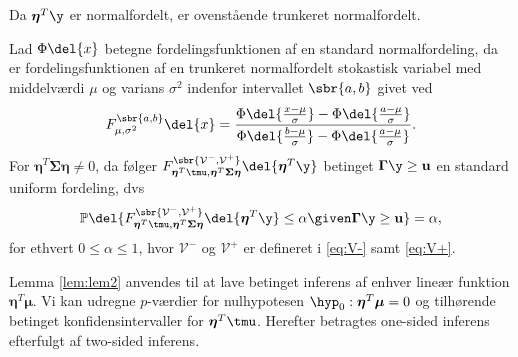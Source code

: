 Da \(\boldsymbol{\eta}^T \y\) er normalfordelt, er ovenstående trunkeret normalfordelt.
%
\begin{lem}  \label{lem:lem2}
Lad \(\Phi \del{x}\) betegne fordelingsfunktionen af en standard normalfordeling, da er fordelingsfunktionen af en trunkeret normalfordelt stokastisk variabel med middelværdi \(\mu\) og varians \(\sigma^2\) indenfor intervallet \(\sbr{a,b}\) givet ved
\begin{align*}
F_{\mu, \sigma^2}^{\sbr{a,b}} \del{x} = \frac{\Phi\del{\frac{x-\mu}{\sigma}} - \Phi\del{\frac{a-\mu}{\sigma}}}{\Phi\del{\frac{b-\mu}{\sigma}} - \Phi\del{\frac{a-\mu}{\sigma}}}.
\end{align*}
For \(\boldsymbol{\eta}^T \boldsymbol{\Sigma} \boldsymbol{\eta} \neq 0\), da følger  \(F_{\boldsymbol{\eta}^T \tmu, \boldsymbol{\eta}^T \boldsymbol{\Sigma} \boldsymbol{\eta}}^{\sbr{\mathcal{V}^-,\mathcal{V}^+}} \del{\boldsymbol{\eta}^T \y} \) betinget \(\boldsymbol{\Gamma} \y \geq \mathbf{u}\) en standard uniform fordeling, dvs
\begin{align*}
\mathbb{P} \del{F_{\boldsymbol{\eta}^T \tmu, \boldsymbol{\eta}^T \boldsymbol{\Sigma} \boldsymbol{\eta}}^{\sbr{\mathcal{V}^-,\mathcal{V}^+}} \del{\boldsymbol{\eta}^T \y} \leq \alpha \given \boldsymbol{\Gamma} \y \geq \mathbf{u}} = \alpha, 
\end{align*}
for ethvert \(0 \leq \alpha \leq 1\), hvor \(\mathcal{V}^-\) og \(\mathcal{V}^+\) er defineret i \eqref{eq:V-} samt \eqref{eq:V+}. 
\end{lem}
%
Lemma \ref{lem:lem2} anvendes til at lave betinget inferens af enhver lineær funktion \(\boldsymbol{\eta}^T \boldsymbol{\mu}\).
Vi kan udregne \(p\)-værdier for nulhypotesen \(\hyp_0: \boldsymbol{\eta}^T \boldsymbol{\mu}=0\) og tilhørende betinget konfidensintervaller for \(\boldsymbol{\eta}^T \tmu\).
%
Herefter betragtes one-sided inferens efterfulgt af two-sided inferens.
%
